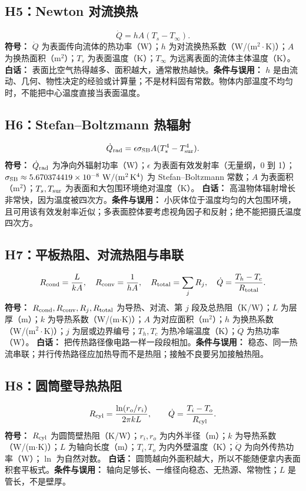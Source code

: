 \documentclass[UTF8,zihao=-4,openany,oneside,fontset=windows]{ctexbook}
\begin{document}
\subsection{H5：Newton 对流换热}
\begin{equation}
\dot Q=hA(T_s-T_\infty).
\end{equation}
\textbf{符号：} $\dot Q$ 为表面传向流体的热功率（W）；$h$ 为对流换热系数（W/(m$^2\cdot$K)）；$A$ 为换热面积（m$^2$）；$T_s$ 为表面温度（K）；$T_\infty$ 为远离表面的流体主体温度（K）。
\textbf{白话：} 表面比空气热得越多、面积越大，通常散热越快。\textbf{条件与误用：} $h$ 是由流动、几何、物性决定的经验或计算量；不是材料固有常数。物体内部温度不均匀时，不能把中心温度直接当表面温度。

\subsection{H6：Stefan--Boltzmann 热辐射}
\begin{equation}
\dot Q_{\rm rad}=\epsilon\sigma_{\rm SB}A(T_s^4-T_{\rm sur}^4).
\end{equation}
\textbf{符号：} $\dot Q_{\rm rad}$ 为净向外辐射功率（W）；$\epsilon$ 为表面有效发射率（无量纲，0 到 1）；$\sigma_{\rm SB}\approx5.670374419\times10^{-8}\ \mathrm{W/(m^2\,K^4)}$ 为 Stefan--Boltzmann 常数；$A$ 为表面积（m$^2$）；$T_s,T_{\rm sur}$ 为表面和大包围环境绝对温度（K）。
\textbf{白话：} 高温物体辐射增长非常快，因为温度被四次方。\textbf{条件与误用：} 小灰体位于温度均匀的大包围环境，且可用该有效发射率近似；多表面腔体要考虑视角因子和反射；绝不能把摄氏温度四次方。

\subsection{H7：平板热阻、对流热阻与串联}
\begin{equation}
R_{\rm cond}=\frac{L}{kA},\quad R_{\rm conv}=\frac1{hA},\quad R_{\rm total}=\sum_jR_j,\quad \dot Q=\frac{T_h-T_c}{R_{\rm total}}.
\end{equation}
\textbf{符号：} $R_{\rm cond},R_{\rm conv},R_j,R_{\rm total}$ 为导热、对流、第 $j$ 段及总热阻（K/W）；$L$ 为层厚（m）；$k$ 为导热系数（W/(m$\cdot$K)）；$A$ 为对应面积（m$^2$）；$h$ 为换热系数（W/(m$^2\cdot$K)）；$j$ 为层或边界编号；$T_h,T_c$ 为热冷端温度（K）；$\dot Q$ 为热功率（W）。
\textbf{白话：} 把传热路径像电路一样一段段相加。\textbf{条件与误用：} 稳态、同一热流串联；并行传热路径应加热导而不是热阻；接触不良要另加接触热阻。

\subsection{H8：圆筒壁导热热阻}
\begin{equation}
R_{\rm cyl}=\frac{\ln(r_o/r_i)}{2\pi kL},\qquad \dot Q=\frac{T_i-T_o}{R_{\rm cyl}}.
\end{equation}
\textbf{符号：} $R_{\rm cyl}$ 为圆筒壁热阻（K/W）；$r_i,r_o$ 为内外半径（m）；$k$ 为导热系数（W/(m$\cdot$K)）；$L$ 为轴向长度（m）；$T_i,T_o$ 为内外壁温度（K）；$\dot Q$ 为向外传热功率（W）；$\ln$ 为自然对数。
\textbf{白话：} 圆筒越向外面积越大，所以不能随便拿内表面积套平板式。\textbf{条件与误用：} 轴向足够长、一维径向稳态、无热源、常物性；$L$ 是管长，不是壁厚。
\end{document}
